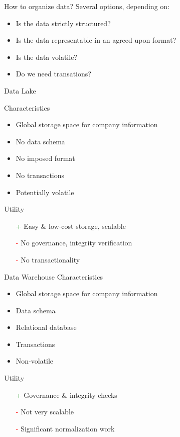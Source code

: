 \begin{frame}{How to organize data?}
  Several options, depending on:
  \begin{itemize}
    \item Is the data strictly structured?
    \item Is the data representable in an agreed upon format?
    \item Is the data volatile?
    \item Do we need transations?
  \end{itemize}
\end{frame}

\begin{frame}{Data Lake}

  Characteristics

  \begin{itemize}
    \item Global storage space for company information
    \item No data schema
    \item No imposed format
    \item No transactions
    \item Potentially volatile
  \end{itemize}

  Utility

  \begin{itemize}
    \item[\textcolor{green}{+}] Easy \& low-cost storage, scalable
    \item[\textcolor{red}{-}] No governance, integrity verification
    \item[\textcolor{red}{-}] No transactionality
  \end{itemize}
\end{frame}

\begin{frame}{Data Warehouse}
  Characteristics

  \begin{itemize}
    \item Global storage space for company information
    \item Data schema
    \item Relational database
    \item Transactions
    \item Non-volatile
  \end{itemize}

  Utility

  \begin{itemize}
    \item[\textcolor{green}{+}] Governance \& integrity checks
    \item[\textcolor{red}{-}] Not very scalable
    \item[\textcolor{red}{-}] Significant normalization work
  \end{itemize}
\end{frame}

